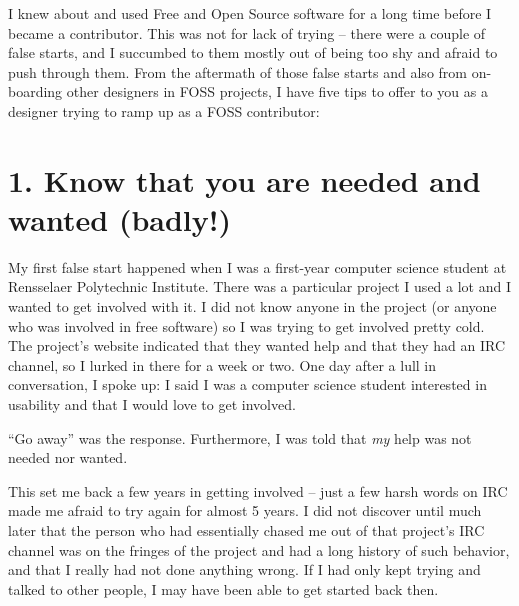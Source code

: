 

\noindent{}I knew about and used Free and Open Source software for a long time before I
became a contributor. This was not for lack of trying -- there were a couple of
false starts, and I succumbed to them mostly out of being too shy and afraid to
push through them. From the aftermath of those false starts and also from
on-boarding other designers in FOSS projects, I have five tips to offer to you
as a designer trying to ramp up as a FOSS contributor:

\section*{1. Know that you are needed and wanted (badly!)}

My first false start happened when I was a first-year computer science student
at Rensselaer Polytechnic Institute. There was a particular project I used a lot
and I wanted to get involved with it. I did not know anyone in the project (or
anyone who was involved in free software) so I was trying to get involved pretty
cold. The project's website indicated that they wanted help and that they had an
IRC channel, so I lurked in there for a week or two. One day after a lull in
conversation, I spoke up: I said I was a computer science student interested in
usability and that I would love to get involved.

``Go away'' was the response. Furthermore, I was told that \emph{my} help was not
needed nor wanted. 

This set me back a few years in getting involved -- just a few harsh words on IRC
made me afraid to try again for almost 5 years.  I did not discover until much
later that the person who had essentially chased me out of that project's IRC
channel was on the fringes of the project and had a long history of such
behavior, and that I really had not done anything wrong. If I had only kept
trying and talked to other people, I may have been able to get started back
then.

